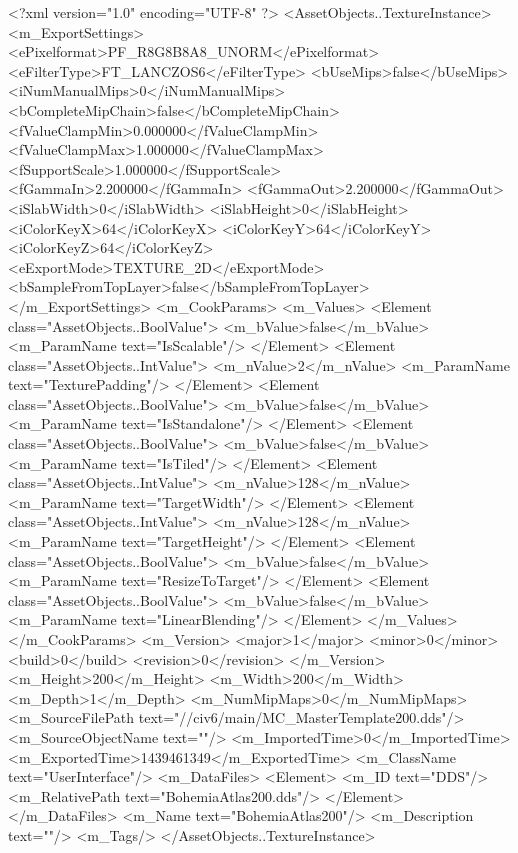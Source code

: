 <?xml version="1.0" encoding="UTF-8" ?>
<AssetObjects..TextureInstance>
	<m_ExportSettings>
		<ePixelformat>PF_R8G8B8A8_UNORM</ePixelformat>
		<eFilterType>FT_LANCZOS6</eFilterType>
		<bUseMips>false</bUseMips>
		<iNumManualMips>0</iNumManualMips>
		<bCompleteMipChain>false</bCompleteMipChain>
		<fValueClampMin>0.000000</fValueClampMin>
		<fValueClampMax>1.000000</fValueClampMax>
		<fSupportScale>1.000000</fSupportScale>
		<fGammaIn>2.200000</fGammaIn>
		<fGammaOut>2.200000</fGammaOut>
		<iSlabWidth>0</iSlabWidth>
		<iSlabHeight>0</iSlabHeight>
		<iColorKeyX>64</iColorKeyX>
		<iColorKeyY>64</iColorKeyY>
		<iColorKeyZ>64</iColorKeyZ>
		<eExportMode>TEXTURE_2D</eExportMode>
		<bSampleFromTopLayer>false</bSampleFromTopLayer>
	</m_ExportSettings>
	<m_CookParams>
		<m_Values>
			<Element class="AssetObjects..BoolValue">
				<m_bValue>false</m_bValue>
				<m_ParamName text="IsScalable"/>
			</Element>
			<Element class="AssetObjects..IntValue">
				<m_nValue>2</m_nValue>
				<m_ParamName text="TexturePadding"/>
			</Element>
			<Element class="AssetObjects..BoolValue">
				<m_bValue>false</m_bValue>
				<m_ParamName text="IsStandalone"/>
			</Element>
			<Element class="AssetObjects..BoolValue">
				<m_bValue>false</m_bValue>
				<m_ParamName text="IsTiled"/>
			</Element>
			<Element class="AssetObjects..IntValue">
				<m_nValue>128</m_nValue>
				<m_ParamName text="TargetWidth"/>
			</Element>
			<Element class="AssetObjects..IntValue">
				<m_nValue>128</m_nValue>
				<m_ParamName text="TargetHeight"/>
			</Element>
			<Element class="AssetObjects..BoolValue">
				<m_bValue>false</m_bValue>
				<m_ParamName text="ResizeToTarget"/>
			</Element>
			<Element class="AssetObjects..BoolValue">
				<m_bValue>false</m_bValue>
				<m_ParamName text="LinearBlending"/>
			</Element>
		</m_Values>
	</m_CookParams>
	<m_Version>
		<major>1</major>
		<minor>0</minor>
		<build>0</build>
		<revision>0</revision>
	</m_Version>
	<m_Height>200</m_Height>
	<m_Width>200</m_Width>
	<m_Depth>1</m_Depth>
	<m_NumMipMaps>0</m_NumMipMaps>
	<m_SourceFilePath text="//civ6/main/MC_MasterTemplate\Textures\BohemiaAtlas200.dds"/>
	<m_SourceObjectName text=""/>
	<m_ImportedTime>0</m_ImportedTime>
	<m_ExportedTime>1439461349</m_ExportedTime>
	<m_ClassName text="UserInterface"/>
	<m_DataFiles>
		<Element>
			<m_ID text="DDS"/>
			<m_RelativePath text="BohemiaAtlas200.dds"/>
		</Element>
	</m_DataFiles>
	<m_Name text="BohemiaAtlas200"/>
	<m_Description text=""/>
	<m_Tags/>
</AssetObjects..TextureInstance>

